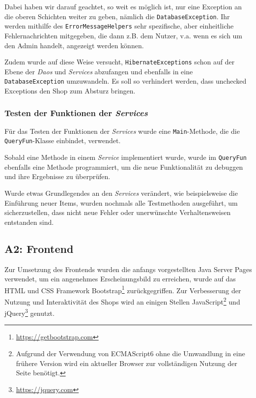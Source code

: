 		Dabei haben wir darauf geachtet, so weit es möglich ist, nur eine Exception an die oberen Schichten weiter zu geben, nämlich die \texttt{DatabaseException}. Ihr werden mithilfe des \texttt{ErrorMessageHelpers} sehr spezifische, aber einheitliche Fehlernachrichten mitgegeben, die dann z.B. dem Nutzer, v.a. wenn es sich um den Admin handelt, angezeigt werden können.
		
		Zudem wurde auf diese Weise versucht, \texttt{HibernateExceptions} schon auf der Ebene der \textit{Daos} und \textit{Services} abzufangen und ebenfalls in eine \texttt{DatabaseException} umzuwandeln. Es soll so verhindert werden, dass unchecked Exceptions den Shop zum Absturz bringen.
		
		\subsubsection{Testen der Funktionen der \textit{Services}}
		Für das Testen der Funktionen der \textit{Services} wurde eine \texttt{Main}-Methode, die die \texttt{QueryFun}-Klasse einbindet, verwendet.
		
		Sobald eine Methode in einem \textit{Service} implementiert wurde, wurde im \texttt{QueryFun} ebenfalls eine Methode programmiert, um die neue Funktionalität zu debuggen und ihre Ergebnisse zu überprüfen.
		
		Wurde etwas Grundlegendes an den \textit{Services} verändert, wie beispielsweise die Einführung neuer Items, wurden nochmals alle Testmethoden ausgeführt, um sicherzustellen, dass nicht neue Fehler oder unerwünschte Verhaltensweisen entstanden sind.
		
	\subsection{A2: Frontend}
	Zur Umsetzung des Frontends wurden die anfangs vorgestellten Java Server Pages verwendet, um ein angenehmes Erscheinungsbild zu erreichen, wurde auf das HTML und CSS Framework Bootstrap\footnote{\hyperlink{https://getbootstrap.com}{https://getbootstrap.com}} zurückgegriffen. Zur Verbesserung der Nutzung und Interaktivität des Shops wird an einigen Stellen JavaScript\footnote{Aufgrund der Verwendung von ECMAScript6 ohne die Umwandlung in eine frühere Version wird ein aktueller Browser zur vollständigen Nutzung der Seite benötigt.} und jQuery\footnote{\hyperlink{https://jquery.com}{https://jquery.com}} genutzt.
	
